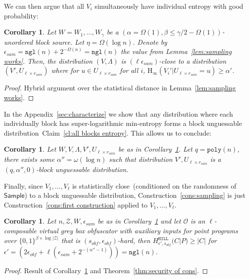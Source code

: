 \documentclass[11pt]{article}
\newcommand{\apref}[1]{\mbox{Appendix~\ref{#1}}}
\newcommand{\thref}[1]{\mbox{Theorem~\ref{#1}}}
\newcommand{\corref}[1]{\mbox{Corollary~\ref{#1}}}
\newcommand{\lemref}[1]{\mbox{Lemma~\ref{#1}}}
\newcommand{\clref}[1]{\mbox{Claim~\ref{#1}}}
\newcommand{\consref}[1]{\mbox{Construction~\ref{#1}}}
\newcommand{\class}[1]{{\ensuremath{\mathsf{#1}}}}
\newcommand{\zo}{\ensuremath{\{0, 1\}}}
\newcommand{\sample}{\ensuremath{\class{Sample}}\xspace}
\newcommand{\hill}{\ensuremath{\mathtt{HILL}}\xspace}
\newcommand{\poly}{\ensuremath{\mathtt{poly}}\xspace}
\newcommand{\ngl}{\ensuremath{\mathtt{ngl}}\xspace}
\newcommand{\Hoo}{\mathrm{H}_\infty}
\newtheorem{corollary}[theorem]{Corollary}
\begin{document}
\noindent
We can then argue that all $V_i$ simultaneously have individual entropy with good probability:
\begin{corollary}
\label{cor:samp sec}
Let $W = W_1,..., W_\gamma$ be a $(\alpha = \Omega(1), \beta \leq \gamma /2-\Omega(1))$-unordered block source.  Let $\eta = \Omega(\log n)$.  Denote by $\epsilon_{sam} = \ngl(n) + 2^{-\Omega(n)} = \ngl(n)$ the value from \lemref{lem:sampling works}.
Then, the distribution $(V, \Lambda)$ is $(\ell\epsilon_{sam})$-close to a distribution $(V', U_{\ell\times r_{sam}})$ where for $u\in U_{\ell\times r_{sam}}$ for all $i$, $\Hoo(V_i' | U_{\ell\times r_{sam}} =u)\geq \alpha'$.
\end{corollary}
\begin{proof}
Hybrid argument over the statistical distance in \lemref{lem:sampling works}.
\end{proof}

In the \apref{sec:characterize} we show that any distribution where each individually block has super-logarithmic min-entropy forms a block unguessable distribution~\clref{cl:all blocks entropy}.  This allows us to conclude:
\begin{corollary}
\label{cor:v are unguessable}
Let $W, V, \Lambda, V', U_{\ell\times r_{sam}}$ be as in \corref{cor:samp sec}.
Let $q = \poly(n)$, there exists some $\alpha'' = \omega(\log n)$ such that distribution $V' , U_{\ell\times r_{sam}}$ is a $(q, \alpha'', 0)$-block unguessable distribution.
\end{corollary}

Finally, since $V_1,..., V_\ell$ is statistically close~(conditioned on the randomness of $\sample$) to a block unguessable distribution, \consref{cons:sampling} is just \consref{cons:first construction} applied to $V_1,..., V_\ell$.
\begin{corollary}
\label{cor:samp unguess}
Let $n, \mathcal{Z}, W, \epsilon_{sam}$ be as in \corref{cor:samp sec} and let $\mathcal{O}$ is an $\ell$-composable virtual grey box obfuscator with auxiliary inputs for point programs over $\zo^{\beta\times \log |\mathcal{Z}|}$ that is $(s_{obf}, \epsilon_{obf})$-hard, then $H^{\hill}_{\epsilon', s_{obf}}(C | P) \geq |C|$ for $\epsilon' = (2\epsilon_{obf} + \ell(\epsilon_{sam}+ 2^{-(\alpha''-1)})) = \ngl(n)$.
\end{corollary}
\begin{proof}
Result of \corref{cor:v are unguessable} and \thref{thm:security of cons}.
\end{proof}
\end{document}
